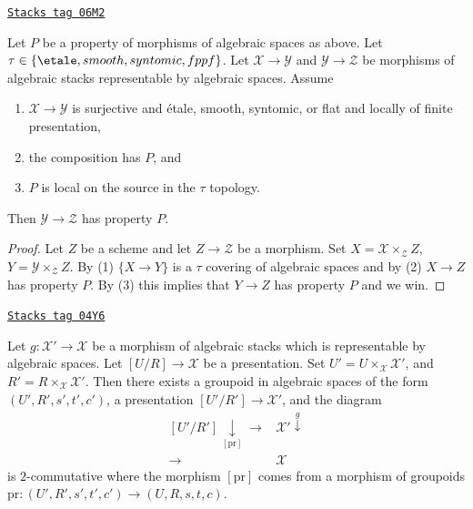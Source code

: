\begin{lemma}
\label{stacks-properties-lemma-check-property-after-precomposing}
\href{https://stacks.math.columbia.edu/tag/06M2}{\texttt{Stacks tag 06M2}}

Let $P$ be a property of morphisms of algebraic spaces as above.
Let $\tau \in \{\etale, smooth, syntomic, fppf\}$.
Let $\mathcal{X} \to \mathcal{Y}$ and $\mathcal{Y} \to \mathcal{Z}$
be morphisms of algebraic stacks representable by algebraic spaces.
Assume
\begin{enumerate}
\item $\mathcal{X} \to \mathcal{Y}$ is surjective and
\'etale, smooth, syntomic, or flat and locally of finite presentation,
\item the composition has $P$, and
\item $P$ is local on the source in the $\tau$ topology.
\end{enumerate}
Then $\mathcal{Y} \to \mathcal{Z}$ has property $P$.
\end{lemma}

\begin{proof}
Let $Z$ be a scheme and let $Z \to \mathcal{Z}$ be a morphism.
Set $X = \mathcal{X} \times_\mathcal{Z} Z$,
$Y = \mathcal{Y} \times_\mathcal{Z} Z$. By (1) $\{X \to Y\}$
is a $\tau$ covering of algebraic spaces and by (2) $X \to Z$ has property
$P$. By (3) this implies that $Y \to Z$ has property $P$
and we win.
\end{proof}

\begin{lemma}
\label{stacks-properties-lemma-representable-in-terms-presentations}
\href{https://stacks.math.columbia.edu/tag/04Y6}{\texttt{Stacks tag 04Y6}}

Let $g : \mathcal{X}' \to \mathcal{X}$ be a morphism of algebraic stacks
which is representable by algebraic spaces. Let $[U/R] \to \mathcal{X}$
be a presentation. Set $U' = U \times_\mathcal{X} \mathcal{X}'$,
and $R' = R \times_\mathcal{X} \mathcal{X}'$.
Then there exists a groupoid in algebraic spaces of the form
$(U', R', s', t', c')$, a presentation $[U'/R'] \to \mathcal{X}'$,
and the diagram
$$
\begin{array}{cc}[U'/R'] \underset{[\text{pr}]}{\downarrow}\longrightarrow & \mathcal{X}' \overset{g}{\downarrow} \\ [U/R] \longrightarrow & \mathcal{X}\end{array}
$$
is $2$-commutative where the morphism $[\text{pr}]$ comes from a
morphism of groupoids
$\text{pr} : (U', R', s', t', c') \to (U, R, s, t, c)$.
\end{lemma}

